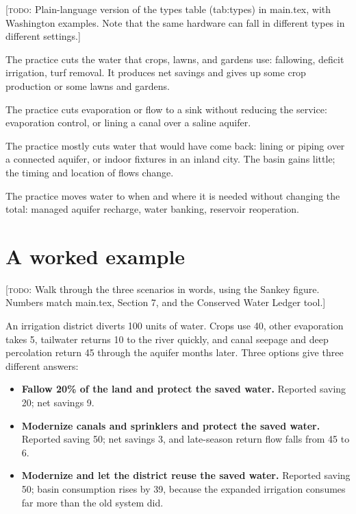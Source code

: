 \documentclass[11pt]{article}
\newcommand{\todo}[1]{\textcolor{orange!70!black}{[\textsc{todo}: #1]}}
\begin{document}
\todo{Plain-language version of the types table (tab:types) in main.tex, with Washington examples. Note that the same hardware can fall in different types in different settings.}

\begin{description}[leftmargin=1.2em]
  \item[Type A: less consumption, less service.] The practice cuts the water that crops, lawns, and gardens use: fallowing, deficit irrigation, turf removal. It produces net savings and gives up some crop production or some lawns and gardens.
  \item[Type B: less loss, same service.] The practice cuts evaporation or flow to a sink without reducing the service: evaporation control, or lining a canal over a saline aquifer.
  \item[Type C: less return flow.] The practice mostly cuts water that would have come back: lining or piping over a connected aquifer, or indoor fixtures in an inland city. The basin gains little; the timing and location of flows change.
  \item[Type D: re-timing and relocation.] The practice moves water to when and where it is needed without changing the total: managed aquifer recharge, water banking, reservoir reoperation.
\end{description}

\section{A worked example}\label{sec:example}

\todo{Walk through the three scenarios in words, using the Sankey figure. Numbers match main.tex, Section 7, and the Conserved Water Ledger tool.}

An irrigation district diverts 100 units of water. Crops use 40, other evaporation takes 5, tailwater returns 10 to the river quickly, and canal seepage and deep percolation return 45 through the aquifer months later. Three options give three different answers:

\begin{itemize}
  \item \textbf{Fallow 20\% of the land and protect the saved water.} Reported saving 20; net savings 9.
  \item \textbf{Modernize canals and sprinklers and protect the saved water.} Reported saving 50; net savings 3, and late-season return flow falls from 45 to 6.
  \item \textbf{Modernize and let the district reuse the saved water.} Reported saving 50; basin consumption rises by 39, because the expanded irrigation consumes far more than the old system did.
\end{itemize}
\end{document}
